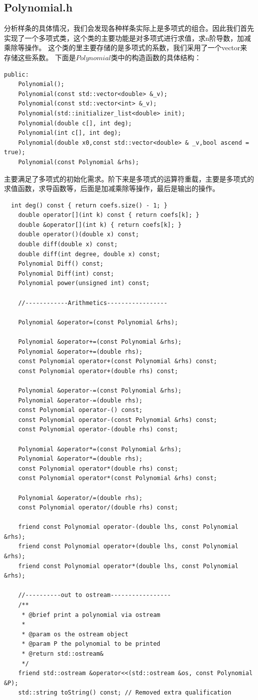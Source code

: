 \documentclass[a4paper]{article}
\begin{document}
\subsection*{\textbf{Polynomial.h}}
分析样条的具体情况，我们会发现各种样条实际上是多项式的组合。因此我们首先实现了一个多项式类，这个类的主要功能是对多项式进行求值，求n阶导数，加减乘除等操作。
这个类的里主要存储的是多项式的系数，我们采用了一个vector来存储这些系数。
下面是$Polynomial$类中的构造函数的具体结构：
\begin{lstlisting}
public:
    Polynomial();
    Polynomial(const std::vector<double> &_v);
    Polynomial(const std::vector<int> &_v);
    Polynomial(std::initializer_list<double> init);
    Polynomial(double c[], int deg);
    Polynomial(int c[], int deg);
    Polynomial(double x0,const std::vector<double> & _v,bool ascend = true);
    Polynomial(const Polynomial &rhs);
\end{lstlisting}
主要满足了多项式的初始化需求。阶下来是多项式的运算符重载，主要是多项式的求值函数，求导函数等，后面是加减乘除等操作，最后是输出的操作。
\begin{lstlisting}
  int deg() const { return coefs.size() - 1; }
    double operator[](int k) const { return coefs[k]; }
    double &operator[](int k) { return coefs[k]; }
    double operator()(double x) const;
    double diff(double x) const;
    double diff(int degree, double x) const;
    Polynomial Diff() const;
    Polynomial Diff(int) const;
    Polynomial power(unsigned int) const;

    //------------Arithmetics-----------------

    Polynomial &operator=(const Polynomial &rhs);

    Polynomial &operator+=(const Polynomial &rhs);
    Polynomial &operator+=(double rhs);
    const Polynomial operator+(const Polynomial &rhs) const;
    const Polynomial operator+(double rhs) const;

    Polynomial &operator-=(const Polynomial &rhs);
    Polynomial &operator-=(double rhs);
    const Polynomial operator-() const;
    const Polynomial operator-(const Polynomial &rhs) const;
    const Polynomial operator-(double rhs) const;

    Polynomial &operator*=(const Polynomial &rhs);
    Polynomial &operator*=(double rhs);
    const Polynomial operator*(double rhs) const;
    const Polynomial operator*(const Polynomial &rhs) const;

    Polynomial &operator/=(double rhs);
    const Polynomial operator/(double rhs) const;

    friend const Polynomial operator-(double lhs, const Polynomial &rhs);
    friend const Polynomial operator+(double lhs, const Polynomial &rhs);
    friend const Polynomial operator*(double lhs, const Polynomial &rhs);

    //----------out to ostream-----------------
    /**
     * @brief print a polynomial via ostream
     *
     * @param os the ostream object
     * @param P the polynomial to be printed
     * @return std::ostream&
     */
    friend std::ostream &operator<<(std::ostream &os, const Polynomial &P);
    std::string toString() const; // Removed extra qualification
\end{lstlisting}
\end{document}
